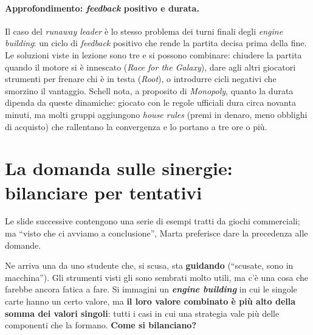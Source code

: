 \paragraph{Approfondimento: \emph{feedback} positivo e durata.} Il caso del \emph{runaway
leader} è lo stesso problema dei turni finali degli \emph{engine building}: un ciclo di
\emph{feedback} positivo che rende la partita decisa prima della fine. Le soluzioni viste in
lezione sono tre e si possono combinare: chiudere la partita quando il motore si è innescato
(\emph{Race for the Galaxy}), dare agli altri giocatori strumenti per frenare chi è in testa
(\emph{Root}), o introdurre cicli negativi che smorzino il vantaggio. Schell nota, a proposito
di \emph{Monopoly}, quanto la durata dipenda da queste dinamiche: giocato con le regole
ufficiali dura circa novanta minuti, ma molti gruppi aggiungono \emph{house rules} (premi in
denaro, meno obblighi di acquisto) che rallentano la convergenza e lo portano a tre ore o più.

\section{La domanda sulle sinergie: bilanciare per tentativi}
\label{a14:sec:sinergie}

Le slide successive contengono una serie di esempi tratti da giochi commerciali; ma
``visto che ci avviamo a conclusione'', Marta preferisce dare la precedenza alle domande.

Ne arriva una da uno studente che, si scusa, sta \textbf{guidando} (``scusate, sono in
macchina''). Gli strumenti visti gli sono sembrati molto utili, ma c'è una cosa che farebbe
ancora fatica a fare. Si immagini un \textbf{\emph{engine building}} in cui le singole carte
hanno un certo valore, ma \textbf{il loro valore combinato è più alto della somma dei valori
singoli}: tutti i casi in cui una strategia vale più delle componenti che la formano.
\textbf{Come si bilanciano?}

